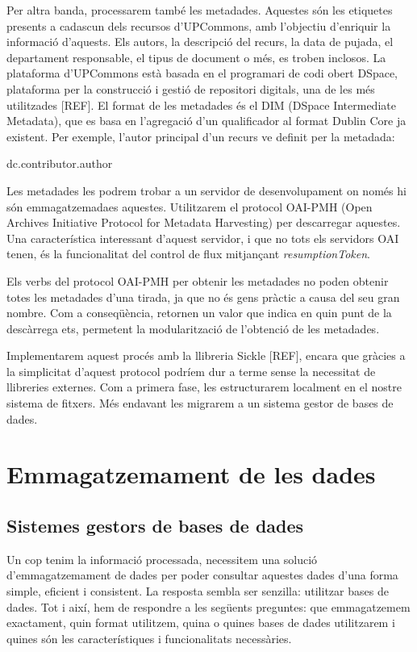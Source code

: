 \documentclass[lettersize,journal]{IEEEtran}
\begin{document}
Per altra banda, processarem també les metadades.
Aquestes són les etiquetes presents a cadascun dels recursos d'UPCommons, amb l'objectiu d'enriquir la informació d'aquests.
Els autors, la descripció del recurs, la data de pujada, el departament responsable, el tipus de document o més, es troben inclosos.
La plataforma d'UPCommons està basada en el programari de codi obert DSpace, plataforma per la construcció i gestió de repositori digitals, una de les més utilitzades [REF].
El format de les metadades és el DIM (DSpace Intermediate Metadata), que es basa en l'agregació d'un qualificador al format Dublin Core ja existent.
Per exemple, l'autor principal d'un recurs ve definit per la metadada:
\begin{center}
    {dc.contributor.author}
\end{center}

Les metadades les podrem trobar a un servidor de desenvolupament on només hi són emmagatzemadaes aquestes.
Utilitzarem el protocol OAI-PMH (Open Archives Initiative Protocol for Metadata Harvesting) per descarregar aquestes.
Una característica interessant d'aquest servidor, i que no tots els servidors OAI tenen, és la funcionalitat del control de flux mitjançant \textit{resumptionToken}.

Els verbs del protocol OAI-PMH per obtenir les metadades no poden obtenir totes les metadades d'una tirada, ja que no és gens pràctic a causa del seu gran nombre.
Com a conseqüència, retornen un valor que indica en quin punt de la descàrrega ets, permetent la modularització de l'obtenció de les metadades.

Implementarem aquest procés amb la llibreria Sickle [REF], encara que gràcies a la simplicitat d'aquest protocol podríem dur a terme sense la necessitat de llibreries externes.
Com a primera fase, les estructurarem localment en el nostre sistema de fitxers.
Més endavant les migrarem a un sistema gestor de bases de dades.


\section{Emmagatzemament de les dades}\label{sec:data-storing}
\subsection{Sistemes gestors de bases de dades}\label{subsec:data-storing-requirements}
Un cop tenim la informació processada, necessitem una solució d'emmagatzemament de dades per poder consultar aquestes dades d'una forma simple, eficient i consistent.
La resposta sembla ser senzilla: utilitzar bases de dades.
Tot i així, hem de respondre a les següents preguntes: que emmagatzemem exactament, quin format utilitzem, quina o quines bases de dades utilitzarem i quines són les característiques i funcionalitats necessàries.
\end{document}
